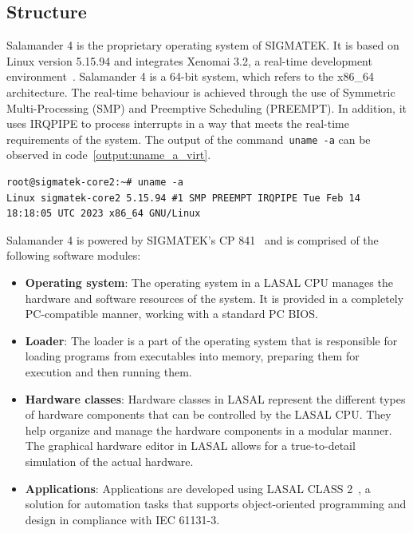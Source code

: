 \documentclass[MMR,Master,english]{twbook}
\begin{document}
\subsection{Structure}
\noindent Salamander 4 is the proprietary operating system of SIGMATEK. It is based on Linux version 5.15.94 and integrates Xenomai 3.2, a real-time development environment~\cite{XenomaiXenomai}. Salamander 4 is a 64-bit system, which refers to the x86\_64 architecture. The real-time behaviour is achieved through the use of Symmetric Multi-Processing (SMP) and Preemptive Scheduling (PREEMPT). In addition, it uses IRQPIPE to process interrupts in a way that meets the real-time requirements of the system. The output of the command~\texttt{uname -a} can be observed in code~\ref{output:uname_a_virt}.


\vspace{2em}
\begin{lstlisting}[name={System information},label={output:uname_a_virt}]
root@sigmatek-core2:~# uname -a
Linux sigmatek-core2 5.15.94 #1 SMP PREEMPT IRQPIPE Tue Feb 14 18:18:05 UTC 2023 x86_64 GNU/Linux
\end{lstlisting}


\noindent Salamander 4 is powered by SIGMATEK's CP 841~\cite{CPUEinheitenSIGMATEK} and is comprised of the following software modules:

\begin{itemize}
	\item \textbf{Operating system}: The operating system in a LASAL CPU manages the hardware and software resources of the system. It is provided in a completely PC-compatible manner, working with a standard PC BIOS.
	\item \textbf{Loader}: The loader is a part of the operating system that is responsible for loading programs from executables into memory, preparing them for execution and then running them.
	\item \textbf{Hardware classes}: Hardware classes in LASAL represent the different types of hardware components that can be controlled by the LASAL CPU. They help organize and manage the hardware components in a modular manner. The graphical hardware editor in LASAL allows for a true-to-detail simulation of the actual hardware.
	\item \textbf{Applications}: Applications are developed using LASAL CLASS 2~\cite{EngineeringToolLASAL}, a solution for automation tasks that supports object-oriented programming and design in compliance with IEC 61131-3.
\end{itemize}
\end{document}
